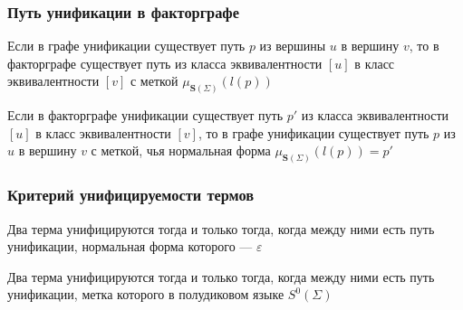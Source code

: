 \documentclass[aspectratio=169]{beamer}
\begin{document}
\begin{frame}[fragile]
  \frametitle{Путь унификации в факторграфе}

\begin{theorem}
  Если в графе унификации существует путь $p$ из вершины $u$ в вершину $v$, то в факторграфе существует путь из класса эквивалентности $[u]$ в класс эквивалентности $[v]$ с меткой $\mu_{\bm{S}(\Sigma)}(l(p))$
\end{theorem}


\begin{theorem}
  Если в факторграфе унификации существует путь $p'$ из класса эквивалентности $[u]$ в класс эквивалентности $[v]$, то в графе унификации существует путь $p$ из $u$ в вершину $v$ с меткой, чья нормальная форма $\mu_{\bm{S}(\Sigma)}(l(p)) = p'$
\end{theorem}


\begin{center}
\end{center}

\end{frame}

\begin{frame}[fragile]
  \frametitle{Критерий унифицируемости термов}

\begin{center}
  Два терма унифицируются тогда и только тогда, когда между ними есть путь унификации, нормальная форма которого --- $\varepsilon$
\end{center}

\begin{center}
  Два терма унифицируются тогда и только тогда, когда между ними есть путь унификации, метка которого в полудиковом языке $S^0(\Sigma)$
\end{center}
\end{frame}
\end{document}
